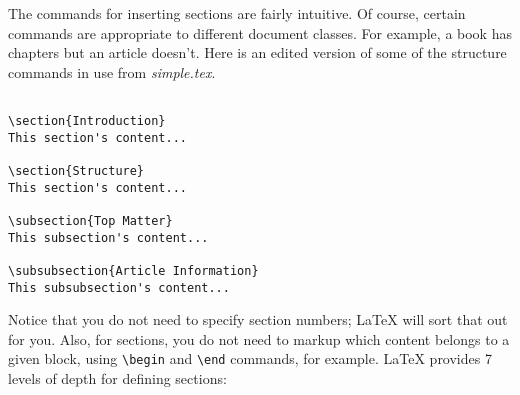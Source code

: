 The commands for inserting sections are fairly intuitive. Of course, certain commands are appropriate to different document classes. For example, a book has chapters but an article doesn't. Here is an edited version of some of the structure commands in use from \textit{simple.tex}.

\begin{lstlisting}

\section{Introduction}
This section's content...

\section{Structure}
This section's content...

\subsection{Top Matter}
This subsection's content...

\subsubsection{Article Information}
This subsubsection's content...

\end{lstlisting}


Notice that you do not need to specify section numbers; LaTeX will sort that out for you. Also, for sections, you do not need to markup which content belongs to a given block, using \lstinline{\begin} and \lstinline{\end} commands, for example. LaTeX provides 7 levels of depth for defining sections:

